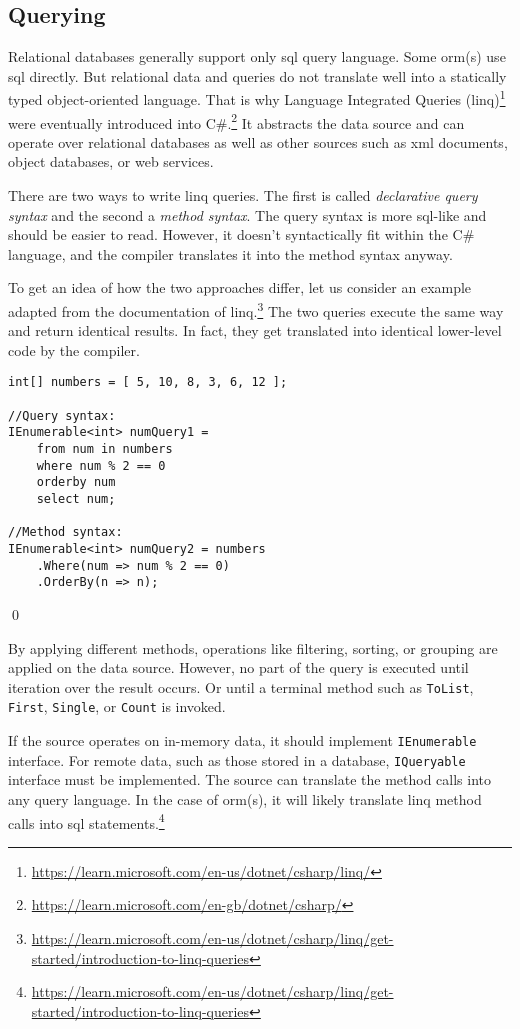 \subsection{Querying}\label{sec:queries}
Relational databases generally support only \acrshort{sql} query language. Some \acrshort{orm}(s) use \acrshort{sql} directly. But relational data and queries do not translate well into a statically typed object-oriented language. That is why Language Integrated Queries (\acrshort{linq})\footnote{\url{https://learn.microsoft.com/en-us/dotnet/csharp/linq/}} were eventually introduced into C\#.\footnote{\url{https://learn.microsoft.com/en-gb/dotnet/csharp/}} It abstracts the data source and can operate over relational databases as well as other sources such as \acrshort{xml} documents, object databases, or web services.

There are two ways to write \acrshort{linq} queries. The first is called \textit{declarative query syntax} and the second a \textit{method syntax}. The query syntax is more \acrshort{sql}-like and should be easier to read. However, it doesn't syntactically fit within the C\# language, and the compiler translates it into the method syntax anyway.

\begin{example}
\small
To get an idea of how the two approaches differ, let us consider an example adapted from the documentation of \acrshort{linq}.\footnote{\url{https://learn.microsoft.com/en-us/dotnet/csharp/linq/get-started/introduction-to-linq-queries}} The two queries execute the same way and return identical results. In fact, they get translated into identical lower-level code by the compiler.

\begin{lstlisting}[language=CSharp]
int[] numbers = [ 5, 10, 8, 3, 6, 12 ];

//Query syntax:
IEnumerable<int> numQuery1 =
    from num in numbers
    where num % 2 == 0
    orderby num
    select num;

//Method syntax:
IEnumerable<int> numQuery2 = numbers
    .Where(num => num % 2 == 0)
    .OrderBy(n => n);
\end{lstlisting}
\qed
\end{example}

By applying different methods, operations like filtering, sorting, or grouping are applied on the data source. However, no part of the query is executed until iteration over the result occurs. Or until a terminal method such as \texttt{ToList}, \texttt{First}, \texttt{Single}, or \texttt{Count} is invoked. 

If the source operates on in-memory data, it should implement \texttt{IEnumerable} interface. For remote data, such as those stored in a database, \texttt{IQueryable} interface must be implemented. The source can translate the method calls into any query language. In the case of \acrshort{orm}(s), it will likely translate \acrshort{linq} method calls into \acrshort{sql} statements.\footnote{\url{https://learn.microsoft.com/en-us/dotnet/csharp/linq/get-started/introduction-to-linq-queries}}